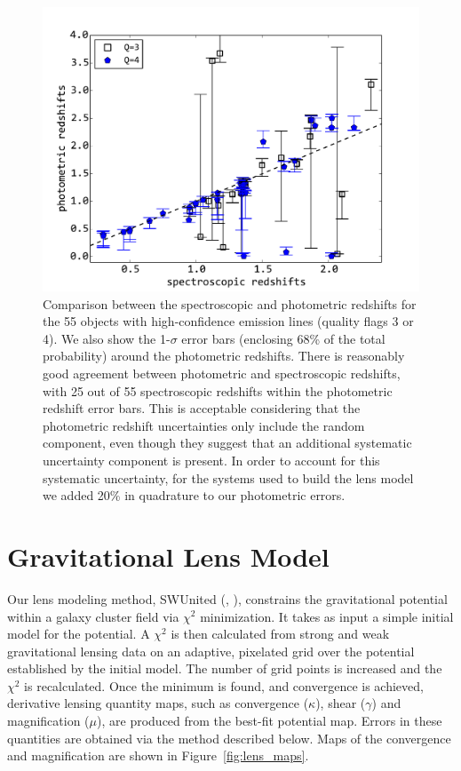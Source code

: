 \begin{figure}[ht]
    \centering
    \includegraphics[width=\textwidth]{fig/a2744_ELobjs_photz_vs_specz.pdf}
    \caption[Comparison between the spectroscopic and photometric redshifts.]{Comparison between the spectroscopic and photometric redshifts for the 55 objects with
    high-confidence emission lines (quality flags 3 or 4).  We also show the 1-$\sigma$ error bars (enclosing
    68\% of the total probability) around the photometric redshifts. There is reasonably good agreement between
    photometric and spectroscopic redshifts, with 25 out of 55 spectroscopic redshifts within the photometric
    redshift error bars. This is acceptable considering that the photometric redshift uncertainties only include
    the random component, even though they suggest that an additional systematic uncertainty component is
    present. In order to account for this systematic uncertainty, for the systems used to build the lens model we
    added 20\% in quadrature to our photometric errors.  \label{fig:ELobjs_photz}}
\end{figure}

\section{Gravitational Lens Model}
\label{sec:mass}

Our lens modeling method, SWUnited (\citealp{bradac09},
\citealp{bradac05}), constrains the gravitational potential within a
galaxy cluster field via $\chi^2$ minimization. It takes as input a
simple initial model for the potential. A $\chi^2$ is then calculated
from strong and weak gravitational lensing data on an adaptive,
pixelated grid over the potential established by the initial
model. The number of grid points is increased and the $\chi^2$ is
recalculated. Once the minimum is found, and convergence is achieved,
derivative lensing quantity maps, such as convergence ($\kappa$),
shear ($\gamma$) and magnification ($\mu$), are produced from the
best-fit potential map. Errors in these quantities are obtained via the method described below.
Maps of the convergence and magnification
are shown in Figure~\ref{fig:lens_maps}.


